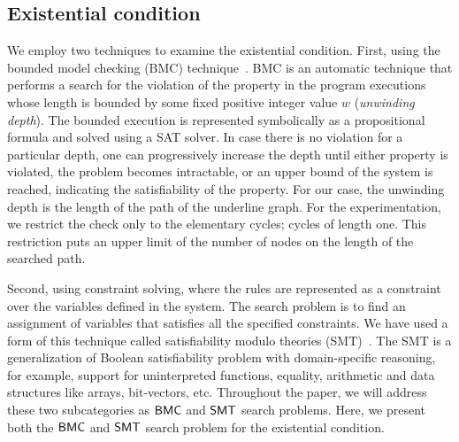 \subsection{Existential condition}
\noindent We employ two techniques to examine the existential condition. 
%
First, using the bounded model checking (BMC) technique~\cite{biere1999symbolic1, biere2003bounded}.
%
%
BMC is an automatic technique that performs a search for the violation of the property in the program executions whose length is bounded by some fixed positive integer value $w$ (\textit{unwinding depth}). 
%
The bounded execution is represented symbolically as a propositional formula and solved using a SAT solver.
%
In case there is no violation for a particular depth, one can progressively increase the depth until either property is violated, the problem becomes intractable, or an upper bound of the system is reached, indicating the satisfiability of the property.
%
For our case, the unwinding depth is the length of the path of the underline graph.
%
%
For the experimentation, we restrict the check only to the elementary cycles; cycles of length one. 
%
This restriction puts an upper limit of the number of nodes on the length of the searched path. 
%
%

Second, using constraint solving, where the rules are represented as a constraint over the variables defined in the system.
%
The search problem is to find an assignment of variables that satisfies all the specified constraints.
%
We have used a form of this technique called satisfiability modulo theories (SMT)~\cite{nieuwenhuis2006solving, barrett2018satisfiability}.
%
The SMT is a generalization of Boolean satisfiability problem with domain-specific reasoning, for example, support for uninterpreted functions, equality, arithmetic and data structures like arrays, bit-vectors, etc. 
%
%
Throughout the paper, we will address these two subcategories as $\mathsf{BMC}$ and $\mathsf{SMT}$ search problems.
%
%
Here, we present both the $\mathsf{BMC}$ and $\mathsf{SMT}$ search problem for the existential condition.

